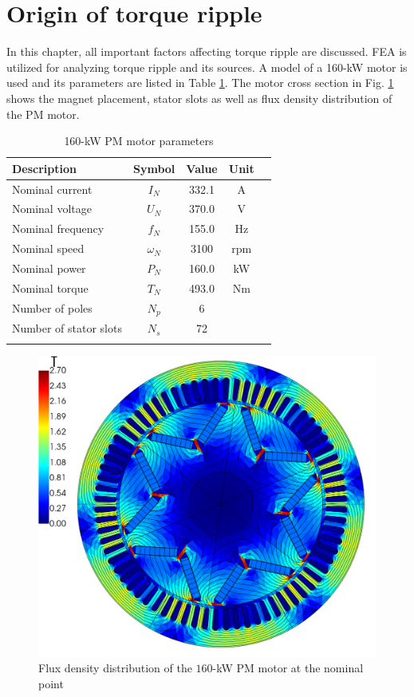 \section{Origin of torque ripple}
In this chapter, all important factors affecting torque ripple are discussed. FEA is utilized for analyzing torque ripple and its sources. A model of a 160-kW motor is used and its parameters are listed in Table \ref{FEM_motor_params}. The motor cross section in Fig. \ref{FEM_flux} shows the magnet placement, stator slots as well as flux density distribution of the PM motor.

\begin{table}[ht]
\caption{160-kW PM motor parameters}
\centering
\begin{tabular}[t]{lcccc}
\hline
Description       & Symbol     & Value  & Unit\\
\hline
Nominal current   & $I_N$      & 332.1  & A\\
Nominal voltage   & $U_N$      & 370.0  & V\\
Nominal frequency & $f_N$      & 155.0  & Hz\\
Nominal speed     & $\omega_N$ & 3100   & rpm\\
Nominal power     & $P_N$      & 160.0  & kW\\
Nominal torque    & $T_N$      & 493.0  & Nm\\
Number of poles   & $N_p$      & 6      & \\
Number of stator slots & $N_s$ & 72     & \\
\hline
\label{FEM_motor_params}
\end{tabular}
\end{table}%

\begin{figure}[htb] 
    \centering
    \includegraphics[width=0.6\linewidth]{images/flux_density.png} 
    \caption{Flux density distribution of the $160$-kW PM motor at the nominal point} 
    \label{FEM_flux} 
\end{figure}


